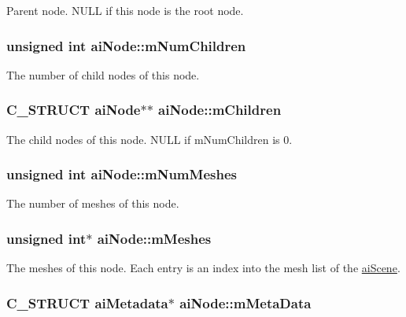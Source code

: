 Parent node. NULL if this node is the root node. \hypertarget{structai_node_f5030494b156ec54632e6182a6e386ca}{
\subsubsection[mNumChildren]{\setlength{\rightskip}{0pt plus 5cm}unsigned int {\bf aiNode::mNumChildren}}}
\label{structai_node_f5030494b156ec54632e6182a6e386ca}


The number of child nodes of this node. \hypertarget{structai_node_c700679f0d4971f124e8444f68057291}{
\subsubsection[mChildren]{\setlength{\rightskip}{0pt plus 5cm}C\_\-STRUCT {\bf aiNode}$\ast$$\ast$ {\bf aiNode::mChildren}}}
\label{structai_node_c700679f0d4971f124e8444f68057291}


The child nodes of this node. NULL if mNumChildren is 0. \hypertarget{structai_node_7a411079096f86d1e96b6368d237d897}{
\subsubsection[mNumMeshes]{\setlength{\rightskip}{0pt plus 5cm}unsigned int {\bf aiNode::mNumMeshes}}}
\label{structai_node_7a411079096f86d1e96b6368d237d897}


The number of meshes of this node. \hypertarget{structai_node_cd1706d6508b31916c18e39b7085ca63}{
\subsubsection[mMeshes]{\setlength{\rightskip}{0pt plus 5cm}unsigned int$\ast$ {\bf aiNode::mMeshes}}}
\label{structai_node_cd1706d6508b31916c18e39b7085ca63}


The meshes of this node. Each entry is an index into the mesh list of the \hyperlink{structai_scene}{aiScene}. \hypertarget{structai_node_111b5a6cbc5dccde0cf2a17a6e5c3b67}{
\subsubsection[mMetaData]{\setlength{\rightskip}{0pt plus 5cm}C\_\-STRUCT {\bf aiMetadata}$\ast$ {\bf aiNode::mMetaData}}}
\label{structai_node_111b5a6cbc5dccde0cf2a17a6e5c3b67}


